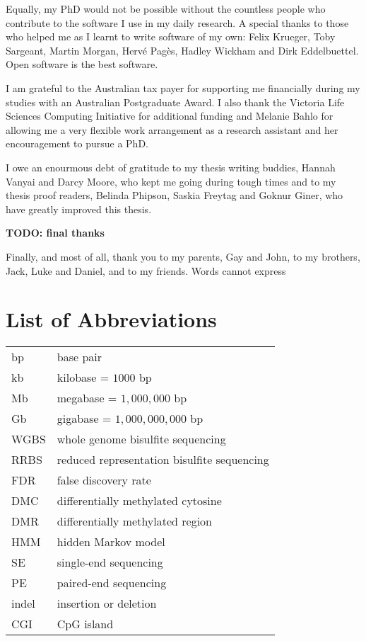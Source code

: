 \documentclass[11pt,a4paper,oneside]{book}	%
\begin{document}
Equally, my PhD would not be possible without the countless people who contribute to the software I use in my daily research. A special thanks to those who helped me as I learnt to write software of my own: Felix Krueger, Toby Sargeant, Martin Morgan, Hervé Pagès, Hadley Wickham and Dirk Eddelbuettel. Open software is the best software.

I am grateful to the Australian tax payer for supporting me financially during my studies with an Australian Postgraduate Award. I also thank the Victoria Life Sciences Computing Initiative for additional funding and Melanie Bahlo for allowing me a very flexible work arrangement as a research assistant and her encouragement to pursue a PhD.

I owe an enourmous debt of gratitude to my thesis writing buddies, Hannah Vanyai and Darcy Moore, who kept me going during tough times and to my thesis proof readers, Belinda Phipson, Saskia Freytag and Goknur Giner, who have greatly improved this thesis.

\textbf{TODO: final thanks}

Finally, and most of all, thank you to my parents, Gay and John, to my brothers, Jack, Luke and Daniel, and to my friends. Words cannot express


\tableofcontents

\listoffigures

\listoftables


\chapter{List of Abbreviations}

\begin{tabular}{ll}

bp & base pair \\
kb & kilobase = $1000$ bp \\
Mb & megabase = $1,000,000$ bp \\
Gb & gigabase = $1,000,000,000$ bp \\
WGBS & whole genome bisulfite sequencing \\
RRBS & reduced representation bisulfite sequencing \\
FDR & false discovery rate \\
DMC & differentially methylated cytosine \\
DMR & differentially methylated region \\
HMM & hidden Markov model \\
SE & single-end sequencing \\
PE & paired-end sequencing \\
indel & insertion or deletion \\
CGI & CpG island \\

\end{tabular}
\end{document}
